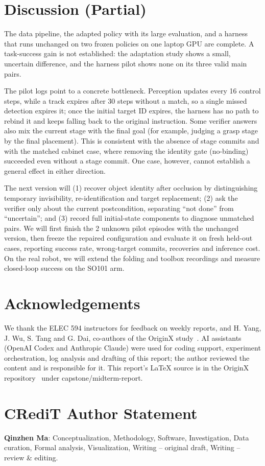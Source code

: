 \documentclass[conference]{IEEEtran}
\begin{document}
\section{Discussion (Partial)}
The data pipeline, the adapted policy with its large evaluation, and a harness that runs unchanged on two frozen policies on one laptop GPU are complete. A task-success gain is not established: the adaptation study shows a small, uncertain difference, and the harness pilot shows none on its three valid main pairs.

The pilot logs point to a concrete bottleneck. Perception updates every 16 control steps, while a track expires after 30 steps without a match, so a single missed detection expires it; once the initial target ID expires, the harness has no path to rebind it and keeps falling back to the original instruction. Some verifier answers also mix the current stage with the final goal (for example, judging a grasp stage by the final placement). This is consistent with the absence of stage commits and with the matched cabinet case, where removing the identity gate (no-binding) succeeded even without a stage commit. One case, however, cannot establish a general effect in either direction.

The next version will (1) recover object identity after occlusion by distinguishing temporary invisibility, re-identification and target replacement; (2) ask the verifier only about the current postcondition, separating ``not done'' from ``uncertain''; and (3) record full initial-state components to diagnose unmatched pairs. We will first finish the 2 unknown pilot episodes with the unchanged version, then freeze the repaired configuration and evaluate it on fresh held-out cases, reporting success rate, wrong-target commits, recoveries and inference cost. On the real robot, we will extend the folding and toolbox recordings and measure closed-loop success on the SO101 arm.

\section*{Acknowledgements}
We thank the ELEC 594 instructors for feedback on weekly reports, and H. Yang, J. Wu, S. Tang and G. Dai, co-authors of the OriginX study~\cite{ma2026originx}. AI assistants (OpenAI Codex and Anthropic Claude) were used for coding support, experiment orchestration, log analysis and drafting of this report; the author reviewed the content and is responsible for it. This report's LaTeX source is in the OriginX repository~\cite{ma2026originx} under capstone/midterm-report.

\section*{CRediT Author Statement}
\textbf{Qinzhen Ma}: Conceptualization, Methodology, Software, Investigation, Data curation, Formal analysis, Visualization, Writing -- original draft, Writing -- review \& editing.



\end{document}
